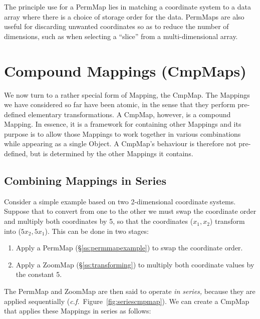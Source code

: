 \documentclass[twoside,11pt]{article}
\newcommand{\secref}[1]{\S\ref{#1}}
\newcommand{\secref}[1]{\ref{#1}}
\begin{document}
The principle use for a PermMap lies in matching a coordinate system
to a data array where there is a choice of storage order for the data.
PermMaps are also useful for discarding unwanted coordinates so as to
reduce the number of dimensions, such as when selecting a ``slice''
from a multi-dimensional array.

\cleardoublepage
\section{\label{ss:cmpmaps}Compound Mappings (CmpMaps)}

We now turn to a rather special form of Mapping, the CmpMap. The
Mappings we have considered so far have been atomic, in the sense that
they perform pre-defined elementary transformations. A CmpMap,
however, is a compound Mapping. In essence, it is a framework for
containing other Mappings and its purpose is to allow those Mappings
to work together in various combinations while appearing as a single
Object. A CmpMap's behaviour is therefore not pre-defined, but is
determined by the other Mappings it contains.

\subsection{\label{ss:seriescmpmap}Combining Mappings in Series}

Consider a simple example based on two 2-dimensional coordinate
systems. Suppose that to convert from one to the other we must swap
the coordinate order and multiply both coordinates by 5, so that the
coordinates ($x_1,x_2$) transform into ($5x_2,5x_1$). This can be done
in two stages:

\begin{enumerate}
\item Apply a PermMap (\secref{ss:permmapexample}) to swap the
coordinate order.

\item Apply a ZoomMap (\secref{ss:transforming}) to multiply both
coordinate values by the constant 5.
\end{enumerate}

The PermMap and ZoomMap are then said to operate {\em{in series,}}
because they are applied sequentially
({\em{c.f.}}\ Figure~\ref{fig:seriescmpmap}).  We can create a CmpMap
that applies these Mappings in series as follows:
\end{document}

